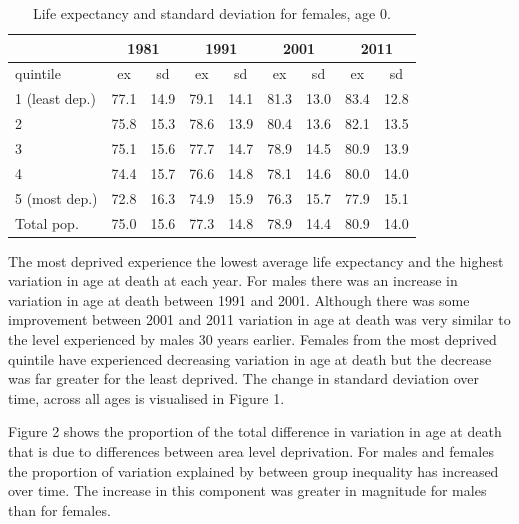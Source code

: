\documentclass[12pt,oneside,a4paper]{article} %
\theoremstyle{definition}
\begin{document}
\begin{table}[htbp]
  \centering
  \caption{Life expectancy and standard deviation for females, age 0.}
    \begin{tabular}{lrrrrrrrr}
          & \multicolumn{2}{c}{1981} & \multicolumn{2}{c}{1991} & \multicolumn{2}{c}{2001} & \multicolumn{2}{c}{2011} \\
    \midrule
    quintile & \multicolumn{1}{c}{ex} & \multicolumn{1}{c}{sd} & \multicolumn{1}{c}{ex} & \multicolumn{1}{c}{sd} & \multicolumn{1}{c}{ex} & \multicolumn{1}{c}{sd} & \multicolumn{1}{c}{ex} & \multicolumn{1}{c}{sd} \\
    \midrule
    1 (least dep.) & 77.1  & 14.9  & 79.1  & 14.1  & 81.3  & 13.0  & 83.4  & 12.8 \\
    2     & 75.8  & 15.3  & 78.6  & 13.9  & 80.4  & 13.6  & 82.1  & 13.5 \\
    3     & 75.1  & 15.6  & 77.7  & 14.7  & 78.9  & 14.5  & 80.9  & 13.9 \\
    4     & 74.4  & 15.7  & 76.6  & 14.8  & 78.1  & 14.6  & 80.0  & 14.0 \\
    5 (most dep.) & 72.8  & 16.3  & 74.9  & 15.9  & 76.3  & 15.7  & 77.9  & 15.1 \\
    Total pop. & 75.0  & 15.6  & 77.3  & 14.8  & 78.9  & 14.4  & 80.9  & 14.0 \\
    \bottomrule
    \end{tabular}%
  \label{tab:addlabel}%
\end{table}%

The most deprived experience the lowest average life expectancy and the highest variation in age at death at each year. For males there was an increase in variation in age at death between 1991 and 2001. Although there was some improvement between 2001 and 2011 variation in age at death was very similar to the level experienced by males 30 years earlier. Females from the most deprived quintile have experienced decreasing variation in age at death but the decrease was far greater for the least deprived. The change in standard deviation over time, across all ages is visualised in Figure 1.

Figure 2 shows the proportion of the total difference in variation in age at death that is due to differences between area level deprivation. For males and females the proportion of variation explained by between group inequality has increased over time. The increase in this component was greater in magnitude for males than for females.
\end{document}
